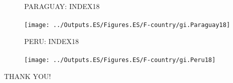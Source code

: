 \documentclass{beamer}
\begin{document}
%
\begin{frame}
	
	\begin{figure}
		\centering
		PARAGUAY: INDEX18\\~\\
		\texttt{[image: ../Outputs.ES/Figures.ES/F-country/gi.Paraguay18]}
	\end{figure}
\end{frame}
%
\begin{frame}
	
	\begin{figure}
		\centering
		PERU: INDEX18\\~\\
		\texttt{[image: ../Outputs.ES/Figures.ES/F-country/gi.Peru18]}
	\end{figure}
\end{frame}
%
	
%

\begin{frame}
	
	THANK YOU!
	
\end{frame}
\end{document}
